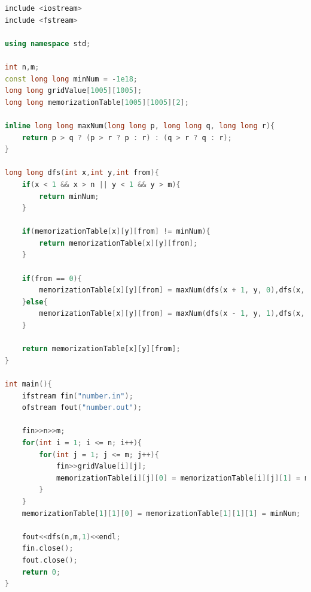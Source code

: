 \documentclass[12pt,twiside,a4paper]{ctexbook}
\numberwithin{chapter}{part}
\begin{document}
\begin{lstlisting}[language=C++,breaklines = true]
include <iostream>
include <fstream>

using namespace std;

int n,m;
const long long minNum = -1e18;
long long gridValue[1005][1005];
long long memorizationTable[1005][1005][2];

inline long long maxNum(long long p, long long q, long long r){
	return p > q ? (p > r ? p : r) : (q > r ? q : r);
}

long long dfs(int x,int y,int from){
	if(x < 1 && x > n || y < 1 && y > m){
		return minNum;
	}

	if(memorizationTable[x][y][from] != minNum){
		return memorizationTable[x][y][from];
	}

	if(from == 0){
		memorizationTable[x][y][from] = maxNum(dfs(x + 1, y, 0),dfs(x, y - 1, 0),dfs(x, y - 1, 1)) + gridValue[x][y];
	}else{
		memorizationTable[x][y][from] = maxNum(dfs(x - 1, y, 1),dfs(x, y - 1, 0),dfs(x, y - 1, 1)) + gridValue[x][y];
	}

	return memorizationTable[x][y][from];
}

int main(){
	ifstream fin("number.in");
	ofstream fout("number.out");

	fin>>n>>m;
	for(int i = 1; i <= n; i++){
		for(int j = 1; j <= m; j++){
			fin>>gridValue[i][j];
			memorizationTable[i][j][0] = memorizationTable[i][j][1] = minNum;
		}
	}
	memorizationTable[1][1][0] = memorizationTable[1][1][1] = minNum;

	fout<<dfs(n,m,1)<<endl;
	fin.close();
	fout.close();
	return 0;
}
\end{lstlisting}
\end{document}
